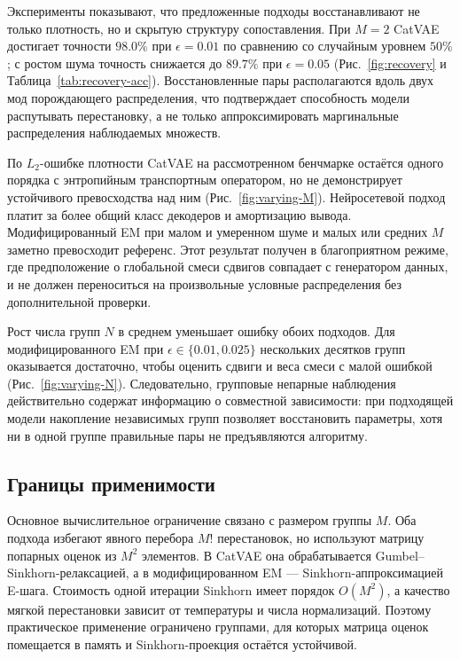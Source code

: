 Эксперименты показывают, что предложенные подходы восстанавливают не только плотность, но и
скрытую структуру сопоставления. При $M=2$ CatVAE достигает точности $98.0\%$ при
$\epsilon=0.01$ по сравнению со случайным уровнем $50\%$; с ростом шума точность снижается
до $89.7\%$ при $\epsilon=0.05$ (Рис.~\ref{fig:recovery} и
Таблица~\ref{tab:recovery-acc}). Восстановленные пары располагаются вдоль двух мод
порождающего распределения, что подтверждает способность модели распутывать перестановку,
а не только аппроксимировать маргинальные распределения наблюдаемых множеств.

По $L_2$-ошибке плотности CatVAE на рассмотренном бенчмарке остаётся одного порядка с
энтропийным транспортным оператором, но не демонстрирует устойчивого превосходства над ним
(Рис.~\ref{fig:varying-M}). Нейросетевой подход платит за более общий класс декодеров и
амортизацию вывода. Модифицированный EM при малом и умеренном шуме и малых или средних $M$
заметно превосходит референс. Этот результат получен в благоприятном режиме, где
предположение о глобальной смеси сдвигов совпадает с генератором данных, и не должен
переноситься на произвольные условные распределения без дополнительной проверки.

Рост числа групп $N$ в среднем уменьшает ошибку обоих подходов. Для модифицированного EM
при $\epsilon\in\{0.01,0.025\}$ нескольких десятков групп оказывается достаточно, чтобы
оценить сдвиги и веса смеси с малой ошибкой (Рис.~\ref{fig:varying-N}). Следовательно,
групповые непарные наблюдения действительно содержат информацию о совместной зависимости:
при подходящей модели накопление независимых групп позволяет восстановить параметры, хотя
ни в одной группе правильные пары не предъявляются алгоритму.

\subsection{Границы применимости}

Основное вычислительное ограничение связано с размером группы $M$. Оба подхода избегают
явного перебора $M!$ перестановок, но используют матрицу попарных оценок из $M^2$ элементов.
В CatVAE она обрабатывается Gumbel--Sinkhorn-релаксацией, а в модифицированном EM ---
Sinkhorn-аппроксимацией E-шага. Стоимость одной итерации Sinkhorn имеет порядок $O(M^2)$,
а качество мягкой перестановки зависит от температуры и числа нормализаций. Поэтому
практическое применение ограничено группами, для которых матрица оценок помещается в память
и Sinkhorn-проекция остаётся устойчивой.

